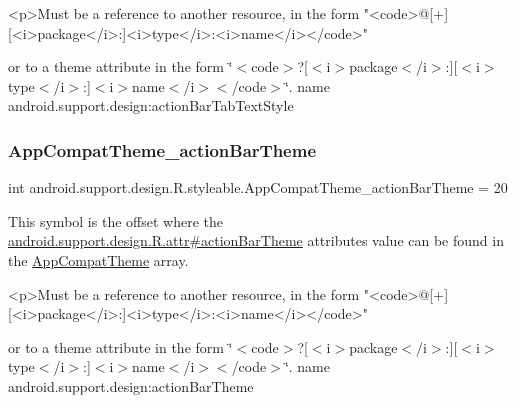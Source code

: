 \begin{DoxyVerb}      <p>Must be a reference to another resource, in the form "<code>@[+][<i>package</i>:]<i>type</i>:<i>name</i></code>"
\end{DoxyVerb}
 or to a theme attribute in the form \char`\"{}$<$code$>$?\mbox{[}$<$i$>$package$<$/i$>$\+:\mbox{]}\mbox{[}$<$i$>$type$<$/i$>$\+:\mbox{]}$<$i$>$name$<$/i$>$$<$/code$>$\char`\"{}.  name android.\+support.\+design\+:action\+Bar\+Tab\+Text\+Style \mbox{\label{classandroid_1_1support_1_1design_1_1R_1_1styleable_a546d385fc73621e6d2b4a7651393cf97}} 
\subsubsection{\texorpdfstring{App\+Compat\+Theme\+\_\+action\+Bar\+Theme}{AppCompatTheme\_actionBarTheme}}
{\footnotesize\ttfamily int android.\+support.\+design.\+R.\+styleable.\+App\+Compat\+Theme\+\_\+action\+Bar\+Theme = 20\hspace{0.3cm}{\ttfamily [static]}}

This symbol is the offset where the \hyperlink{classandroid_1_1support_1_1design_1_1R_1_1attr_aa73a7a3e8185f77a2a9cfffdaeb18049}{android.\+support.\+design.\+R.\+attr\#action\+Bar\+Theme} attribute\textquotesingle{}s value can be found in the \hyperlink{classandroid_1_1support_1_1design_1_1R_1_1styleable_afb351dc8de20cbd4c89abe360373010c}{App\+Compat\+Theme} array.

\begin{DoxyVerb}      <p>Must be a reference to another resource, in the form "<code>@[+][<i>package</i>:]<i>type</i>:<i>name</i></code>"
\end{DoxyVerb}
 or to a theme attribute in the form \char`\"{}$<$code$>$?\mbox{[}$<$i$>$package$<$/i$>$\+:\mbox{]}\mbox{[}$<$i$>$type$<$/i$>$\+:\mbox{]}$<$i$>$name$<$/i$>$$<$/code$>$\char`\"{}.  name android.\+support.\+design\+:action\+Bar\+Theme \mbox{\label{classandroid_1_1support_1_1design_1_1R_1_1styleable_aa29dc2ceab71fce65a98112d59814cc4}} 

